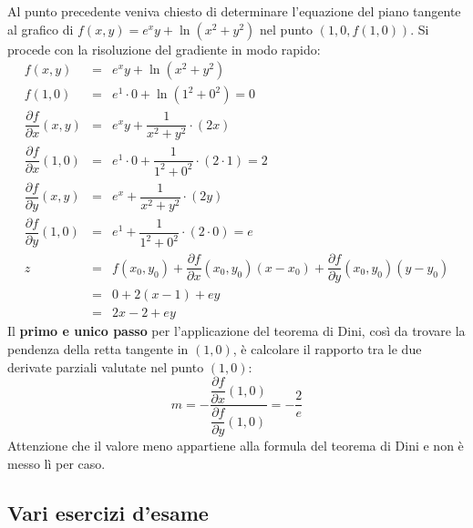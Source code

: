 \documentclass[a4paper]{article}
\begin{document}
	\noindent
	Al punto precedente veniva chiesto di determinare l'equazione del piano tangente al grafico di $f\left(x,y\right) = e^{x}y + \ln\left(x^{2} + y^{2}\right)$ nel punto $\left(1,0,f\left(1,0\right)\right)$. Si procede con la risoluzione del gradiente in modo rapido:\
	\begin{equation*}
		\begin{array}{rcl}
			f\left(x,y\right) &=& e^{x}y + \ln\left(x^{2} + y^{2}\right) \\ [1em]
			f\left(1,0\right) &=& e^{1} \cdot 0 + \ln\left(1^{2} + 0^{2}\right) = 0 \\ [1em]
			\dfrac{\partial f}{\partial x}\left(x,y\right) &=& e^{x}y + \dfrac{1}{x^{2} + y^{2}} \cdot \left(2x\right) \\ [1.5em]
			\dfrac{\partial f}{\partial x}\left(1,0\right) &=& e^{1}\cdot 0 + \dfrac{1}{1^{2} + 0^{2}} \cdot \left(2 \cdot 1\right) = 2 \\ [2em]
			\dfrac{\partial f}{\partial y}\left(x,y\right) &=& e^{x} + \dfrac{1}{x^{2} + y^{2}} \cdot \left(2y\right) \\ [1.5em]
			\dfrac{\partial f}{\partial y}\left(1,0\right) &=& e^{1} + \dfrac{1}{1^{2} + 0^{2}} \cdot \left(2 \cdot 0\right) = e \\ [2em]
			z &=& f\left(x_{0},y_{0}\right) + \dfrac{\partial f}{\partial x}\left(x_{0}, y_{0}\right)\left(x-x_{0}\right) + \dfrac{\partial f}{\partial y}\left(x_{0}, y_{0}\right)\left(y-y_{0}\right) \\ [1em]
			&=& 0 + 2\left(x-1\right) + ey \\
			&=& 2x -2 + ey
		\end{array}
	\end{equation*}
	Il \textbf{primo e unico passo} per l'applicazione del teorema di Dini, così da trovare la pendenza della retta tangente in $\left(1,0\right)$, è calcolare il rapporto tra le due derivate parziali valutate nel punto $\left(1,0\right)$:
	\begin{equation*}
		m = - \dfrac{\dfrac{\partial f}{\partial x}\left(1,0\right)}{\dfrac{\partial f}{\partial y}\left(1,0\right)} = - \dfrac{2}{e}
	\end{equation*}
	Attenzione che il valore meno appartiene alla formula del teorema di Dini e non è messo lì per caso.\newpage

	\subsection{Vari esercizi d'esame}
\end{document}
